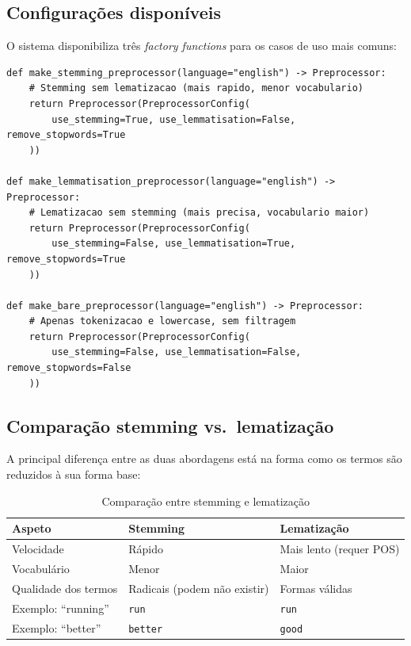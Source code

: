 \documentclass[12pt,a4paper]{article}
\begin{document}
\subsection{Configurações disponíveis}

O sistema disponibiliza três \emph{factory functions} para os casos de uso mais comuns:

\begin{lstlisting}[caption={Factory functions para configurações pré-definidas}]
def make_stemming_preprocessor(language="english") -> Preprocessor:
    # Stemming sem lematizacao (mais rapido, menor vocabulario)
    return Preprocessor(PreprocessorConfig(
        use_stemming=True, use_lemmatisation=False, remove_stopwords=True
    ))

def make_lemmatisation_preprocessor(language="english") -> Preprocessor:
    # Lematizacao sem stemming (mais precisa, vocabulario maior)
    return Preprocessor(PreprocessorConfig(
        use_stemming=False, use_lemmatisation=True, remove_stopwords=True
    ))

def make_bare_preprocessor(language="english") -> Preprocessor:
    # Apenas tokenizacao e lowercase, sem filtragem
    return Preprocessor(PreprocessorConfig(
        use_stemming=False, use_lemmatisation=False, remove_stopwords=False
    ))
\end{lstlisting}

\subsection{Comparação stemming vs.\ lematização}

A principal diferença entre as duas abordagens está na forma como os termos são reduzidos à sua forma base:

\begin{table}[H]
\centering
\caption{Comparação entre stemming e lematização}
\begin{tabular}{@{}lll@{}}
\toprule
\textbf{Aspeto}       & \textbf{Stemming}          & \textbf{Lematização} \\
\midrule
Velocidade           & Rápido                     & Mais lento (requer POS) \\
Vocabulário          & Menor                      & Maior \\
Qualidade dos termos & Radicais (podem não existir) & Formas válidas \\
Exemplo: ``running'' & \texttt{run}               & \texttt{run} \\
Exemplo: ``better''  & \texttt{better}            & \texttt{good} \\
\bottomrule
\end{tabular}
\end{table}
\end{document}
